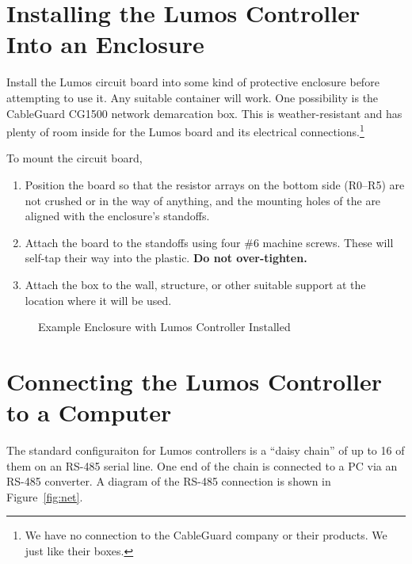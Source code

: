 \documentclass[letterpaper,twoside,onecolumn,openright,final]{memoir}
\begin{document}
\section{Installing the Lumos Controller Into an Enclosure}
Install the Lumos circuit board into some kind of protective
enclosure before attempting to use it.  Any suitable container will work.  One possibility is the
CableGuard\textsuperscript{\textregistered}
CG1500 network demarcation box.  This is weather-resistant and has plenty of room inside for the
Lumos board and its electrical connections.\footnote{We have no connection to the CableGuard
company or their products. We just like their boxes.}

To mount the circuit board,
\begin{enumerate}
	\item Position the board so that the resistor arrays on the bottom side
		(R0--R5) are not crushed or in the way of anything, and the mounting
		holes of the  are aligned with the enclosure's standoffs.
	\item Attach the board to the standoffs using four \#6 machine screws.  These will
		self-tap their way into the plastic. {\bfseries Do not over-tighten.}
	\item Attach the box to the wall, structure, or other suitable support at the location
		where it will be used.
\end{enumerate}
\begin{figure}
	\centerline{}
	\caption{Example Enclosure with Lumos Controller Installed}
\end{figure}

\section{Connecting the Lumos Controller to a Computer}
The standard configuraiton for Lumos controllers is a ``daisy chain'' of up to 16 of them on an RS-485
serial line.  One end of the chain is connected to a PC via an RS-485 converter. 
A diagram of the RS-485 connection is shown in Figure~\ref{fig:net}.  

\end{document}
